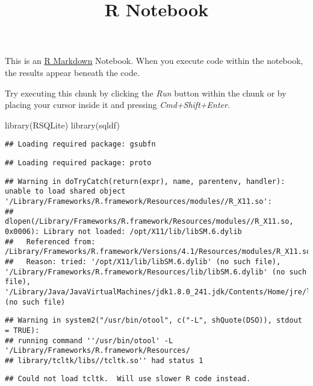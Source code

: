 \documentclass[
]{article}
\title{R Notebook}
\author{}
\date{\vspace{-2.5em}}
\newenvironment{Shaded}{\begin{snugshade}}{\end{snugshade}}
\newcommand{\FunctionTok}[1]{\textcolor[rgb]{0.00,0.00,0.00}{#1}}
\newcommand{\NormalTok}[1]{#1}
\begin{document}
\maketitle

This is an \href{http://rmarkdown.rstudio.com}{R Markdown} Notebook.
When you execute code within the notebook, the results appear beneath
the code.

Try executing this chunk by clicking the \emph{Run} button within the
chunk or by placing your cursor inside it and pressing
\emph{Cmd+Shift+Enter}.

\begin{Shaded}
\begin{Highlighting}[]
\FunctionTok{library}\NormalTok{(RSQLite)}
\FunctionTok{library}\NormalTok{(sqldf)}
\end{Highlighting}
\end{Shaded}

\begin{verbatim}
## Loading required package: gsubfn
\end{verbatim}

\begin{verbatim}
## Loading required package: proto
\end{verbatim}

\begin{verbatim}
## Warning in doTryCatch(return(expr), name, parentenv, handler): unable to load shared object '/Library/Frameworks/R.framework/Resources/modules//R_X11.so':
##   dlopen(/Library/Frameworks/R.framework/Resources/modules//R_X11.so, 0x0006): Library not loaded: /opt/X11/lib/libSM.6.dylib
##   Referenced from: /Library/Frameworks/R.framework/Versions/4.1/Resources/modules/R_X11.so
##   Reason: tried: '/opt/X11/lib/libSM.6.dylib' (no such file), '/Library/Frameworks/R.framework/Resources/lib/libSM.6.dylib' (no such file), '/Library/Java/JavaVirtualMachines/jdk1.8.0_241.jdk/Contents/Home/jre/lib/server/libSM.6.dylib' (no such file)
\end{verbatim}

\begin{verbatim}
## Warning in system2("/usr/bin/otool", c("-L", shQuote(DSO)), stdout = TRUE):
## running command ''/usr/bin/otool' -L '/Library/Frameworks/R.framework/Resources/
## library/tcltk/libs//tcltk.so'' had status 1
\end{verbatim}

\begin{verbatim}
## Could not load tcltk.  Will use slower R code instead.
\end{verbatim}
\end{document}
